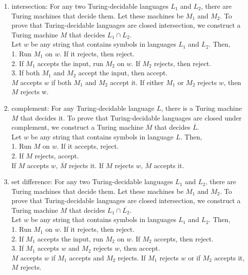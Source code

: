 \documentclass{article}
\begin{document}
\begin{enumerate}[\indent a)]
    \item intersection: For any two Turing-decidable languages $L_1$ and $L_2$, there are Turing machines that decide them. Let these machines be $M_1$ and $M_2$. To prove that Turing-decidable languages are closed intersection, we construct a Turing machine $M$ that decides $L_1 \cap L_2$.
    \\Let $w$ be any string that contains symbols in languages $L_1$ and $L_2$. Then,
    \\1. Run $M_1$ on $w$. If it rejects, then reject.
    \\2. If $M_1$ accepts the input, run $M_2$ on $w$. If $M_2$ rejects, then reject.
    \\3. If both $M_1$ and $M_2$ accept the input, then accept.
    \\$M$ accepts $w$ if both $M_1$ and $M_2$ accept it. If either $M_1$ or $M_2$ rejects $w$, then $M$ rejects w.
    \item complement: For any Turing-decidable language $L$, there is a Turing machine $M$ that decides it. To prove that Turing-decidable languages are closed under complement, we construct a Turing machine $\overline{M}$ that decides $\overline{L}$.
    \\Let $w$ be any string that contains symbols in language $L$. Then,
    \\1. Run $M$ on $w$. If it accepts, reject.
    \\2. If $M$ rejects, accept.
    \\If $M$ accepts $w$, $\overline{M}$ rejects it. If $M$ rejects $w$, $\overline{M}$ accepts it.
    \item set difference: For any two Turing-decidable languages $L_1$ and $L_2$, there are Turing machines that decide them. Let these machines be $M_1$ and $M_2$. To prove that Turing-decidable languages are closed intersection, we construct a Turing machine $M$ that decides $L_1 \cap \overline{L_2}$.
    \\Let $w$ be any string that contains symbols in languages $L_1$ and $L_2$. Then,
    \\1. Run $M_1$ on $w$. If it rejects, then reject.
    \\2. If $M_1$ accepts the input, run $M_2$ on $w$. If $M_2$ accepts, then reject.
    \\3. If $M_1$ accepts $w$ and $M_2$ rejects $w$, then accept.
    \\$M$ accepts $w$ if $M_1$ accepts and $M_2$ rejects. If $M_1$ rejects $w$ or if $M_2$ accepts it, $M$ rejects.
\end{enumerate} 
\end{document}

